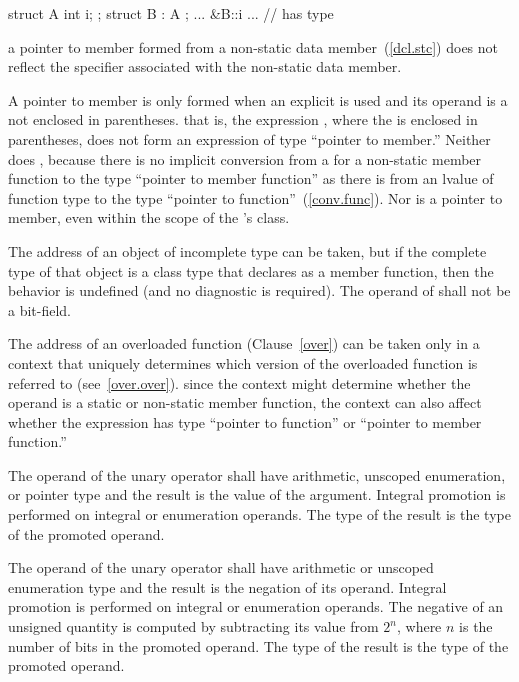 \begin{codeblock}
struct A { int i; };
struct B : A { };
... &B::i ...       // has type 
\end{codeblock}
\exitexample 
\enternote 
a pointer to member formed from a  non-static data
member~(\ref{dcl.stc}) does not reflect the  specifier
associated with the non-static data member.
\exitnote 

\pnum
A pointer to member is only formed when an explicit \tcode{\&} is used
and its operand is a  not enclosed in
parentheses.
\enternote 
that is, the expression , where the
 is enclosed in parentheses, does not form an
expression of type ``pointer to member.'' Neither does
, because there is no implicit conversion from a
 for a non-static member function to the type
``pointer to member function'' as there is from an lvalue of function
type to the type ``pointer to function''~(\ref{conv.func}). Nor is
 a pointer to member, even within the scope of
the 's class.
\exitnote 

\pnum
The address of an object of incomplete type can be taken, but if the
complete type of that object is a class type that declares
 as a member function, then the behavior is
undefined (and no diagnostic is required). The operand of \tcode{\&}
shall not be a bit-field.

\pnum
{}%
The address of an overloaded function (Clause~\ref{over}) can be taken
only in a context that uniquely determines which version of the
overloaded function is referred to (see~\ref{over.over}).
\enternote 
since the context might determine whether the operand is a static or
non-static member function, the context can also affect whether the
expression has type ``pointer to function'' or ``pointer to member
function.''
\exitnote 

\pnum
{}%
The operand of the unary \tcode{+} operator shall have arithmetic, unscoped
enumeration, or pointer type and the result is the value of the
argument. Integral promotion is performed on integral or enumeration
operands. The type of the result is the type of the promoted operand.

\pnum
{}%
The operand of the unary \tcode{-} operator shall have arithmetic or unscoped
enumeration type and the result is the negation of its operand. Integral
promotion is performed on integral or enumeration operands. The negative
of an unsigned quantity is computed by subtracting its value from $2^n$,
where $n$ is the number of bits in the promoted operand. The type of the
result is the type of the promoted operand.

